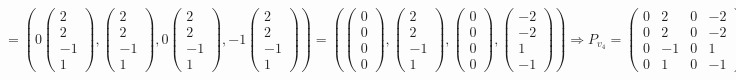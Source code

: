 \documentclass{article}
\begin{document}
$$= \left(0\begin{pmatrix}2 \\ 2 \\ -1 \\ 1\end{pmatrix}, \begin{pmatrix}2 \\ 2 \\ -1 \\ 1\end{pmatrix}, 0\begin{pmatrix}2 \\ 2 \\ -1 \\ 1\end{pmatrix}, -1\begin{pmatrix}2 \\ 2 \\ -1 \\ 1\end{pmatrix}\right) = \left(\begin{pmatrix}0 \\ 0 \\ 0 \\ 0\end{pmatrix}, \begin{pmatrix}2 \\ 2 \\ -1 \\ 1\end{pmatrix}, \begin{pmatrix}0 \\ 0 \\ 0 \\ 0\end{pmatrix}, \begin{pmatrix}-2 \\ -2 \\ 1 \\ -1\end{pmatrix}\right) \Rightarrow P_{v_4} = \begin{pmatrix}
0 & 2 & 0 & -2 \\
0 & 2 & 0 & -2 \\
0 & -1 & 0 & 1 \\
0 & 1 & 0 & -1
\end{pmatrix} $$ \\
\end{document}
